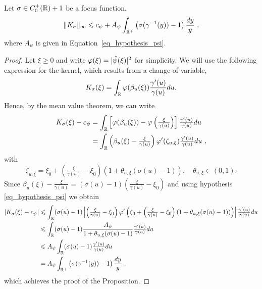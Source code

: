 \begin{prop}\label{prop_upper_bound_control}
    Let $\sigma\in C_0^+(\mathbb{R})+1$ be a focus function.
    \begin{align}
        \|K_{\sigma}\|_\infty \leqslant c_\psi + A_\psi \int_{\mathbb{R}^+}\left(\sigma(\gamma^{-1}(y))-1\right)\frac{dy}{y}\ ,
    \end{align}
    where $A_\psi$ is given in Equation~\eqref{eq_hypothesis_psi}.
\end{prop}
\begin{proof}
    Let $\xi\geqslant0$ and write $\varphi(\xi)=|\hat{\psi}(\xi)|^2$ for simplicity. We will use the following expression for the kernel, which results from a change of variable,
    \begin{equation*}
        K_\sigma(\xi) = \int_{\mathbb{R}} \varphi(\beta_u(\xi))\frac{\gamma'(u)}{\gamma(u)}du.
    \end{equation*}
    Hence, by the mean value theorem, we can write
    \begin{align*}
        K_\sigma(\xi) - c_\psi & = \int_{\mathbb{R}}\left[ \varphi(\beta_u(\xi)) - \varphi\left(\tfrac{\xi}{\gamma(u)}\right) \right]\tfrac{\gamma'(u)}{\gamma(u)} du \\
        & = \int_{\mathbb{R}} \left( \beta_u(\xi)-\tfrac{\xi}{\gamma(u)} \right) \varphi'(\zeta_{u,\xi})\tfrac{\gamma'(u)}{\gamma(u)}du\ ,
    \end{align*}
    with
    \begin{equation*}
        \zeta_{u,\xi} = \xi_0 +\left( \tfrac{\xi}{\gamma(u)}-\xi_0 \right)(1+\theta_{u,\xi}(\sigma(u)-1)), \quad \theta_{u,\xi}\in (0,1).
    \end{equation*}
    Since $\beta_u(\xi)-\tfrac{\xi}{\gamma(u)}=(\sigma(u)-1)\left( \tfrac{\xi}{\gamma(u)}-\xi_0 \right)$ and using hypothesis \eqref{eq_hypothesis_psi} we obtain
    \begin{align*}
        |K_\sigma(\xi) - c_\psi| & \leqslant \int_{\mathbb{R}} (\sigma(u)-1)\left|\left( \tfrac{\xi}{\gamma(u)}-\xi_0 \right)\varphi'\left( \xi_0 +\left( \tfrac{\xi}{\gamma(u)}-\xi_0 \right)(1+\theta_{u,\xi}(\sigma(u)-1)) \right) \right|\tfrac{\gamma'(u)}{\gamma(u)} du \\
        & \leqslant \int_{\mathbb{R}} (\sigma(u)-1)\frac{A_\psi}{1+\theta_{u,\xi}(\sigma(u)-1)}\tfrac{\gamma'(u)}{\gamma(u)}du \\
        & \leqslant A_\psi \int_{\mathbb{R}} (\sigma(u)-1)\tfrac{\gamma'(u)}{\gamma(u)}du \\
        & =A_\psi \int_{\mathbb{R}^+}\left(\sigma(\gamma^{-1}(y))-1\right)\frac{dy}{y}\ ,
    \end{align*}
    which achieves the proof of the Proposition.
\end{proof}

